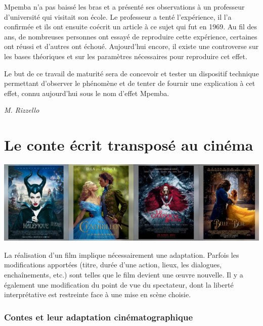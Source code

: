 \documentclass[
  10pt,
  french,
  a5paper,
  openany]{book}
\newenvironment{signature}{\begin{flushright}}{\end{flushright}}
\begin{document}
Mpemba n'a pas baissé les bras et a présenté ses observations à un professeur d'université qui visitait son école. Le professeur a tenté l'expérience, il l'a confirmée et ils ont ensuite coécrit un article à ce sujet qui fut en 1969. Au fil des ans, de nombreuses personnes ont essayé de reproduire cette expérience, certaines ont réussi et d'autres ont échoué. Aujourd'hui encore, il existe une controverse sur les bases théoriques et sur les paramètres nécessaires pour reproduire cet effet.

Le but de ce travail de maturité sera de concevoir et tester un dispositif technique permettant d'observer le phénomène et de tenter de fournir une explication à cet effet, connu aujourd'hui sous le nom d'effet Mpemba.

\begin{signature}
\emph{M. Rizzello}

\end{signature}

\hypertarget{le-conte-uxe9crit-transposuxe9-au-cinuxe9ma}{%
\chapter{Le conte écrit transposé au cinéma}\label{le-conte-uxe9crit-transposuxe9-au-cinuxe9ma}}

\begin{center}
\includegraphics[width=1\textwidth,height=\textheight]{images/le-conte-ecrit-transpose-au-cinema.jpg}

\end{center}

La réalisation d'un film implique nécessairement une adaptation. Parfois les modifications apportées (titre, durée d'une action, lieux, les dialogues, enchaînements, etc.) sont telles que le film devient une œuvre nouvelle.
Il y a également une modification du point de vue du spectateur, dont la liberté interprétative est restreinte face à une mise en scène choisie.

\hypertarget{contes-et-leur-adaptation-cinuxe9matographique}{%
\subsection*{Contes et leur adaptation cinématographique}\label{contes-et-leur-adaptation-cinuxe9matographique}}
\end{document}
